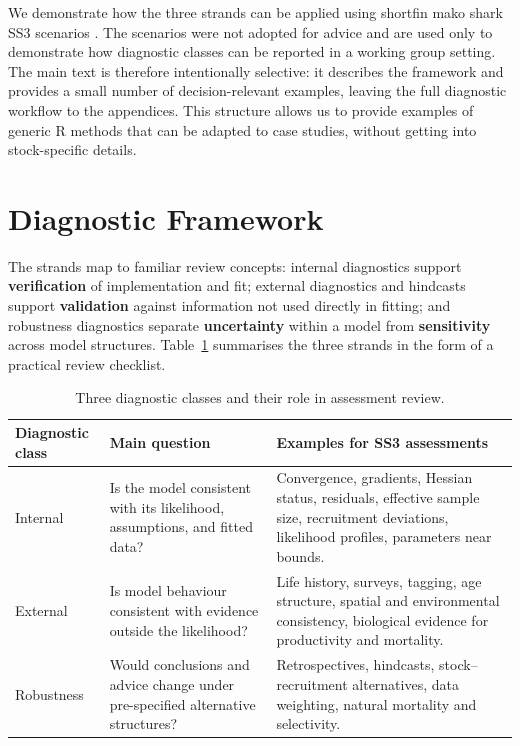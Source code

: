 \documentclass[11pt,a4paper]{article}
\begin{document}
We demonstrate how the three strands can be applied using shortfin mako shark SS3 scenarios \citep{ICCAT2025SMA}. The scenarios were not adopted for advice and are used only to demonstrate how diagnostic classes can be reported in a working group setting. The main text is therefore intentionally selective: it describes the framework and provides a small number of decision-relevant examples, leaving the full diagnostic workflow to the appendices. This structure allows us to provide examples of generic R methods that can be adapted to case studies, without getting into stock-specific details.

\section{Diagnostic Framework}

The strands map to familiar review concepts: internal diagnostics support \textbf{verification} of implementation and fit; external diagnostics and hindcasts support \textbf{validation} against information not used directly in fitting; and robustness diagnostics separate \textbf{uncertainty} within a model from \textbf{sensitivity} across model structures. Table~\ref{tab:diag-classes} summarises the three strands in the form of a practical review checklist. 

\begin{table}[H]
  \centering
  \caption{Three diagnostic classes and their role in assessment review.}
  \label{tab:diag-classes}
  \small
  \begin{tabularx}{\textwidth}{>{\raggedright\arraybackslash}p{3.0cm}>{\raggedright\arraybackslash}p{5.0cm}>{\raggedright\arraybackslash}X}
    \toprule
    Diagnostic class & Main question & Examples for SS3 assessments \\
    \midrule
    Internal & Is the model consistent with its likelihood, assumptions, and fitted data? & Convergence, gradients, Hessian status, residuals, effective sample size, recruitment deviations, likelihood profiles, parameters near bounds. \\
    External & Is model behaviour consistent with evidence outside the likelihood? & Life history, surveys, tagging, age structure, spatial and environmental consistency, biological evidence for productivity and mortality. \\
    Robustness & Would conclusions and advice change under pre-specified alternative structures? & Retrospectives, hindcasts, stock--recruitment alternatives, data weighting, natural mortality and selectivity. \\
    \bottomrule
  \end{tabularx}
\end{table}
\end{document}

